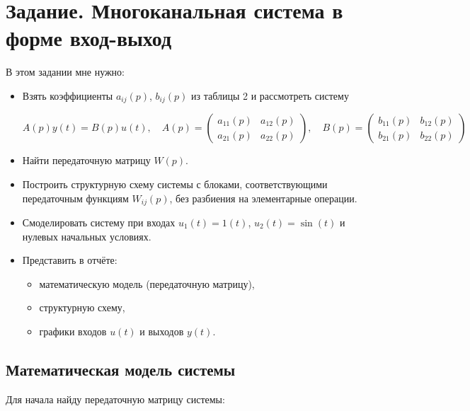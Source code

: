 \documentclass[a4paper,12pt]{article}
\begin{document}
	
	\newpage
	\section{Задание. Многоканальная система в форме вход-выход}
	
	В этом задании мне нужно:
	
	\begin{itemize}
		
		\item Взять коэффициенты \(a_{ij}(p)\), \(b_{ij}(p)\) из таблицы 2 и рассмотреть систему
		
		\[
		A(p) y(t) = B(p) u(t),
		\quad
		A(p) = \begin{pmatrix}
			a_{11}(p) & a_{12}(p) \\
			a_{21}(p) & a_{22}(p)
		\end{pmatrix},
		\quad
		B(p) = \begin{pmatrix}
			b_{11}(p) & b_{12}(p) \\
			b_{21}(p) & b_{22}(p)
		\end{pmatrix}
		\]
		
		\item Найти передаточную матрицу \(W(p)\).
		
		\item Построить структурную схему системы с блоками, соответствующими передаточным функциям \(W_{ij}(p)\), без разбиения на элементарные операции.
		
		\item Смоделировать систему при входах \(u_1(t) = 1(t)\), \(u_2(t) = \sin(t)\) и нулевых начальных условиях.
		
		\item Представить в отчёте:
		\begin{itemize}
			\item математическую модель (передаточную матрицу),
			\item структурную схему,
			\item графики входов \(u(t)\) и выходов \(y(t)\).
		\end{itemize}
		
	\end{itemize}
	
	\subsection{Математическая модель системы}
	
	Для начала найду передаточную матрицу системы:
	
\end{document}
